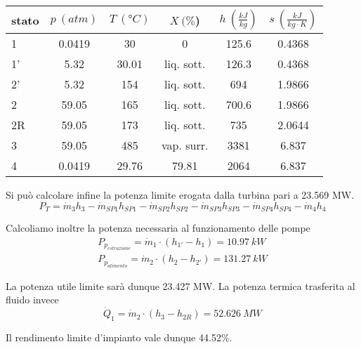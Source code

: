 \begin{center}
    \begin{tabular}{l|c|c|c|c|c}
        stato    & $p\ (atm)$ & $T\ (\text{°}C) $&$X\ (\%$)& $h\ (\frac{kJ}{kg})$  & $s\ (\frac{kJ}{kg\cdot K})$\\ \hline
        1   &        0.0419 &            30   &    0      & 125.6    &0.4368 \\ \hline     %
        1'  &        5.32    &           30.01   &liq. sott.  & 126.3&0.4368 \\ \hline      %
        2'  &          5.32  &         154&liq. sott.           &694&1.9866  \\ \hline      %
        2   &          59.05&           165&liq. sott.      &700.6& 1.9866   \\ \hline      %
        2R  &       59.05   &           173     &liq. sott. &  735  & 2.0644 \\ \hline      %
        3   &        59.05  &            485&  vap. surr.    &  3381 &6.837  \\ \hline      %
        4   &        0.0419       &      29.76&     79.81 &    2064  &6.837                %
    \end{tabular}
\end{center}

Si può calcolare infine la potenza limite erogata dalla turbina pari a 23.569 MW.
\begin{equation*}
    P_T = \dot m_3 h_3 - \dot m_{SP1} h_{SP1} - \dot m_{SP2} h_{SP2} - \dot m_{SP3} h_{SP3} -\dot m_{SP4} h_{SP4} - \dot m_{4} h_4
\end{equation*}

Calcoliamo inoltre la potenza necessaria al funzionamento delle pompe
\begin{align*}
    P_{p_{estrazione}} = \dot m_1 \cdot (h_{1'} - h_1) = 10.97\ kW \\
    P_{p_{alimento}} = \dot m_2 \cdot (h_2 - h_{2'} ) = 131.27\ kW
\end{align*}

La potenza utile limite sarà dunque 23.427 MW.
La potenza termica trasferita al fluido invece
\begin{equation*}
    \dot Q_1 = \dot m_2 \cdot (h_3 - h_{2R}) = 52.626\ MW
\end{equation*}

Il rendimento limite d'impianto vale dunque 44.52\%.

